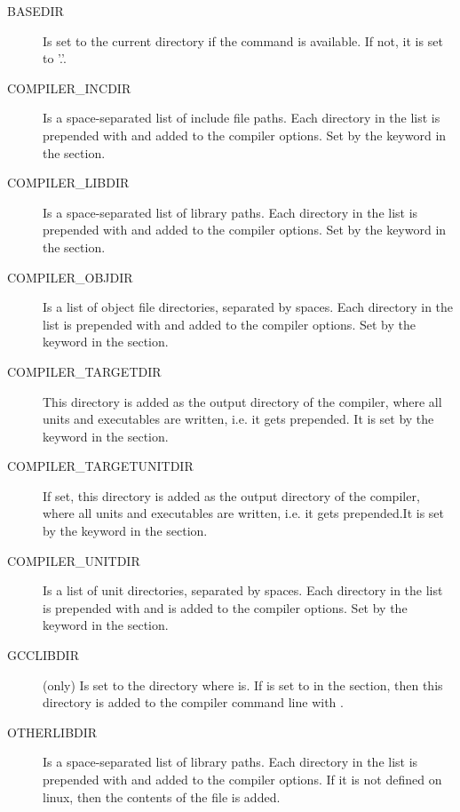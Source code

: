 \begin{description}
\item[BASEDIR] Is set to the current directory if the  command is
available. If not, it is set to '.'.

\item[COMPILER\_INCDIR] Is a space-separated list of include file paths. Each
directory in the list is prepended with  and added to the
compiler options. Set by the  keyword in the  section.

\item[COMPILER\_LIBDIR] Is a space-separated list of library paths. Each
directory in the list is prepended with  and added to the 
compiler options. Set by the  keyword in the  section.

\item[COMPILER\_OBJDIR] Is a list of object file directories, separated by
 spaces. Each directory in the list is prepended with  and
added to the compiler options.
Set by the  keyword in the  section.

\item[COMPILER\_TARGETDIR] This directory is added as the output directory of
the compiler, where all units and executables are written, i.e. it gets
 prepended. It is set by the  keyword in the
 section.

\item[COMPILER\_TARGETUNITDIR] If set, this directory is added as the output directory of
the compiler, where all units and executables are written, i.e. it gets
 prepended.It is set by the  keyword in the
 section.

\item[COMPILER\_UNITDIR] Is a list of unit directories, separated by spaces.
Each directory in the list is prepended with  and is added to the
compiler options.
Set by the  keyword in the  section.

\item[GCCLIBDIR] (\linux only) Is set to the directory where 
is. If  is set to  in the  section, then
this directory is added to the compiler command line with .

\item[OTHERLIBDIR] Is a space-separated list of library paths. Each
directory in the list is prepended with  and added to the 
compiler options.  If it is not defined on linux, then the contents of 
the  file is added.
\end{description}

